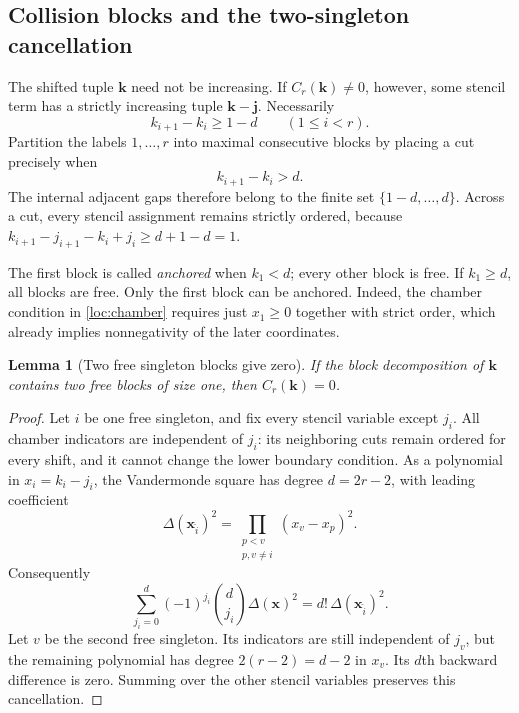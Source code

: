 \documentclass[11pt,a4paper]{article}
\numberwithin{equation}{section}
\newtheorem{lemma}[theorem]{Lemma}
\theoremstyle{definition}
\theoremstyle{remark}
\begin{document}
\subsection{Collision blocks and the two-singleton cancellation}

The shifted tuple $\mathbf k$ need not be increasing.  If
$C_r(\mathbf k)\ne0$, however, some stencil term has a strictly increasing
tuple $\mathbf k-\mathbf j$.  Necessarily
\begin{equation}
 k_{i+1}-k_i\ge1-d\qquad(1\le i<r).
 \label{loc:gap-lower}
\end{equation}
Partition the labels $1,\ldots,r$ into maximal consecutive blocks by
placing a cut precisely when
\begin{equation}
 k_{i+1}-k_i>d.
 \label{loc:cut}
\end{equation}
The internal adjacent gaps therefore belong to the finite set
$\{1-d,\ldots,d\}$.  Across a cut, every stencil assignment remains
strictly ordered, because
$k_{i+1}-j_{i+1}-k_i+j_i\ge d+1-d=1$.

The first block is called \emph{anchored} when $k_1<d$; every other block
is free.  If $k_1\ge d$, all blocks are free.  Only the first block can
be anchored.  Indeed, the chamber condition in \eqref{loc:chamber}
requires just $x_1\ge0$ together with strict order, which already implies
nonnegativity of the later coordinates.

\begin{lemma}[Two free singleton blocks give zero]
\label{loc:singleton}
If the block decomposition of $\mathbf k$ contains two free blocks of
size one, then $C_r(\mathbf k)=0$.
\end{lemma}

\begin{proof}
Let $i$ be one free singleton, and fix every stencil variable except
$j_i$.  All chamber indicators are independent of $j_i$: its neighboring
cuts remain ordered for every shift, and it cannot change the lower
boundary condition.  As a polynomial in $x_i=k_i-j_i$, the Vandermonde
square has degree $d=2r-2$, with leading coefficient
\[
 \Delta(\mathbf x_{\widehat i})^2
       =\prod_{\substack{p<v\\p,v\ne i}}(x_v-x_p)^2.
\]
Consequently
\[
 \sum_{j_i=0}^d(-1)^{j_i}\binom d{j_i}\Delta(\mathbf x)^2
       =d!\,\Delta(\mathbf x_{\widehat i})^2.
\]
Let $v$ be the second free singleton.  Its indicators are still
independent of $j_v$, but the remaining polynomial has degree
$2(r-2)=d-2$ in $x_v$.  Its $d$th backward difference is zero.  Summing
over the other stencil variables preserves this cancellation.
\end{proof}
\end{document}
